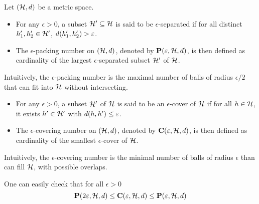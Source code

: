 \begin{tcolorbox}
    \begin{definition}
        Let $(\mathcal{H}, d)$ be a metric space. 
        \begin{itemize}
            \item For any $\epsilon> 0$, a subset $\mathcal{H}' \subseteq \mathcal{H}$ is said to be $\epsilon$-separated if for all distinct $h'_1, h'_2 \in \mathcal{H}'$, $d(h'_1, h'_2) > \varepsilon$.
            \item The $\epsilon$-packing number on $(\mathcal{H}, d)$, denoted by $\mathbf{P}(\varepsilon, \mathcal{H}, d)$, is then defined as cardinality of the largest $\epsilon$-separated subset $\mathcal{H}'$ of $\mathcal{H}$.
        \end{itemize}
        Intuitively, the $\epsilon$-packing number is the maximal number of balls of radius $\epsilon/2$ that can fit into $\mathcal{H}$ without intersecting.
        \begin{itemize}
            \item For any $\epsilon> 0$, a subset $\mathcal{H}'$ of $\mathcal{H}$ is said to be an $\epsilon$-cover of $\mathcal{H}$ if for all $h \in \mathcal{H}$, it exists $h' \in \mathcal{H}'$ with $d(h, h') \leq \varepsilon$.
            \item The $\epsilon$-covering number on $(\mathcal{H}, d)$, denoted by $\mathbf{C}(\varepsilon, \mathcal{H}, d)$, is then defined as cardinality of the smallest $\epsilon$-cover of $\mathcal{H}$.
        \end{itemize}
        Intuitively, the $\epsilon$-covering number is the minimal number of balls of radius $\epsilon$ than can fill $\mathcal{H}$, with possible overlaps.
    \end{definition}
\end{tcolorbox}

    One can easily check that for all $\epsilon>0$
    \begin{equation}
        \mathbf{P}(2\varepsilon, \mathcal{H}, d) \leq \mathbf{C}(\varepsilon, \mathcal{H}, d) \leq \mathbf{P}(\varepsilon, \mathcal{H}, d)
    \end{equation}





